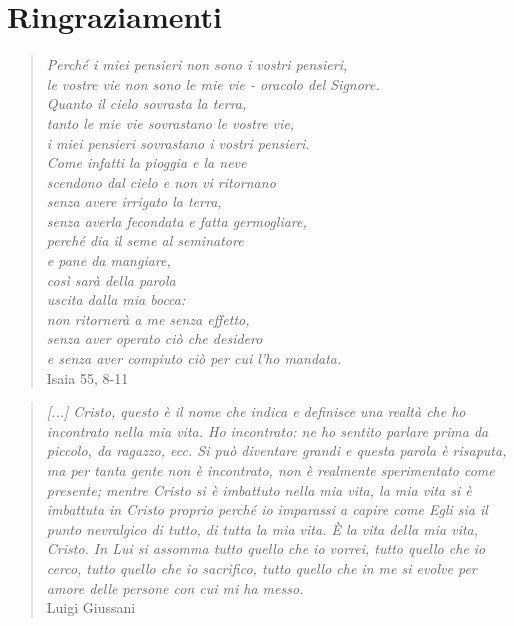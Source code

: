 \chapter*{Ringraziamenti}

\begin{verse}
    \textit{Perché i miei pensieri non sono i vostri pensieri, \\
    le vostre vie non sono le mie vie - oracolo del Signore. \\
    Quanto il cielo sovrasta la terra, \\
    tanto le mie vie sovrastano le vostre vie, \\
    i miei pensieri sovrastano i vostri pensieri. \\
    Come infatti la pioggia e la neve \\
    scendono dal cielo e non vi ritornano \\
    senza avere irrigato la terra, \\
    senza averla fecondata e fatta germogliare, \\
    perché dia il seme al seminatore \\
    e pane da mangiare, \\
    così sarà della parola \\
    uscita dalla mia bocca: \\
    non ritornerà a me senza effetto, \\
    senza aver operato ciò che desidero \\
    e senza aver compiuto ciò per cui l'ho mandata. \\}
    Isaia 55, 8-11
\end{verse}


\begin{quote}
    \emph{[...] Cristo, questo è il nome che indica e definisce una realtà che ho incontrato nella mia vita. Ho incontrato: ne ho sentito parlare prima da piccolo, da ragazzo, ecc. Si può diventare grandi e questa parola è risaputa, ma per tanta gente non è incontrato, non è realmente sperimentato come presente; mentre Cristo si è imbattuto nella mia vita, la mia vita si è imbattuta in Cristo proprio perché io imparassi a capire come Egli sia il punto nevralgico di tutto, di tutta la mia vita. \emph{È la vita della mia vita, Cristo.} In Lui si assomma tutto quello che io vorrei, tutto quello che io cerco, tutto quello che io sacrifico, tutto quello che in me si evolve per amore delle persone con cui mi ha messo.} \\
    Luigi Giussani %
\end{quote}